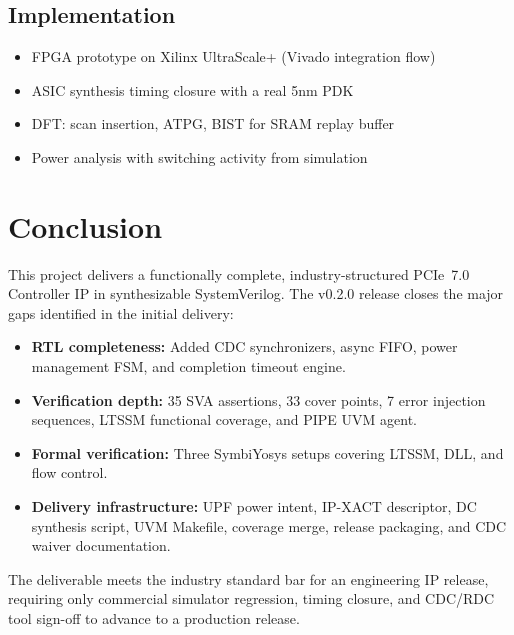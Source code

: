 \documentclass[12pt,a4paper]{report}
\begin{document}
\section{Implementation}

\begin{itemize}[noitemsep]
  \item FPGA prototype on Xilinx UltraScale+ (Vivado integration flow)
  \item ASIC synthesis timing closure with a real 5nm PDK
  \item DFT: scan insertion, ATPG, BIST for SRAM replay buffer
  \item Power analysis with switching activity from simulation
\end{itemize}

\chapter{Conclusion}

This project delivers a functionally complete, industry-structured PCIe~7.0
Controller IP in synthesizable SystemVerilog. The v0.2.0 release closes the
major gaps identified in the initial delivery:

\begin{itemize}[noitemsep]
  \item \textbf{RTL completeness:} Added CDC synchronizers, async FIFO,
    power management FSM, and completion timeout engine.
  \item \textbf{Verification depth:} 35 SVA assertions, 33 cover points,
    7 error injection sequences, LTSSM functional coverage, and PIPE UVM agent.
  \item \textbf{Formal verification:} Three SymbiYosys setups covering LTSSM,
    DLL, and flow control.
  \item \textbf{Delivery infrastructure:} UPF power intent, IP-XACT descriptor,
    DC synthesis script, UVM Makefile, coverage merge, release packaging, and
    CDC waiver documentation.
\end{itemize}

The deliverable meets the industry standard bar for an engineering IP release,
requiring only commercial simulator regression, timing closure, and CDC/RDC
tool sign-off to advance to a production release.

\appendix
\end{document}
